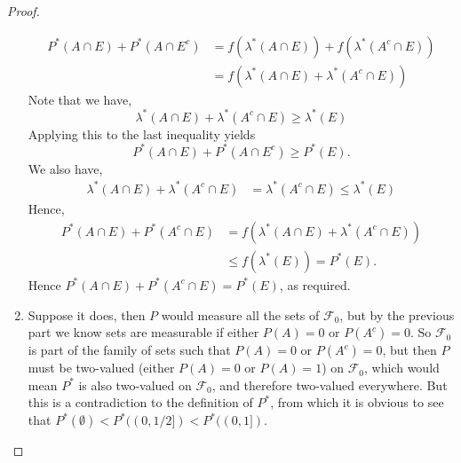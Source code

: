 \documentclass[11pt]{article}
\newcommand{\F}{\mathcal{F}}
\newcommand{\es}{\emptyset}
\newcommand{\ic}{\cap}
\begin{document}
\begin{proof}
\begin{enumerate}
        \begin{align*}
            P^{\ast} (A \ic E) + P^{\ast} (A \ic E^c) &= f(\lambda^\ast (A \ic E)) + f(\lambda^\ast (A^c \ic E)) \\
            &= f(\lambda^{\ast} (A \ic E) + \lambda^{\ast} (A^c \ic E))
        \end{align*}
        Note that we have,
        \[ \lambda^{\ast} (A \ic E) + \lambda^{\ast} (A^c \ic E) \geq \lambda^{\ast} (E) \]
        Applying this to the last inequality yields
        \[ P^{\ast} (A \ic E) + P^{\ast} (A \ic E^c) \geq P^{\ast} (E). \]
        We also have,
        \begin{align*}
            \lambda^{\ast} (A \ic E) + \lambda^{\ast} (A^c \ic E) &= \lambda^{\ast} (A^c \ic E) \leq \lambda^{\ast} (E)
        \end{align*}
        Hence,
        \begin{align*}
            P^\ast (A \ic E) + P^\ast (A^c \ic E) &= f(\lambda^{\ast} (A \ic E) + \lambda^{\ast} (A^c \ic E)) \\
            &\leq f(\lambda^{\ast} (E)) = P^\ast (E).
        \end{align*}
        Hence $P^\ast (A \ic E) + P^\ast (A^c \ic E) = P^\ast (E)$, as required.
        \item Suppose it does, then $P$ would measure all the sets of $\F_0$, but by the previous part we know sets are measurable if either $P(A) = 0$ or $P(A^c) = 0$. So $\F_0$ is part of the family of sets such that $P(A) = 0$ or $P(A^c) = 0$, but then $P$ must be two-valued (either $P(A) = 0$ or $P(A) = 1$) on $\F_0$, which would mean $P^\ast$ is also two-valued on $\F_0$, and therefore two-valued everywhere. But this is a contradiction to the definition of $P^\ast$, from which it is obvious to see that $P^\ast(\es) < P^\ast ((0, 1/2]) < P^\ast((0, 1])$.
    \end{enumerate}
\end{proof}
\end{document}

